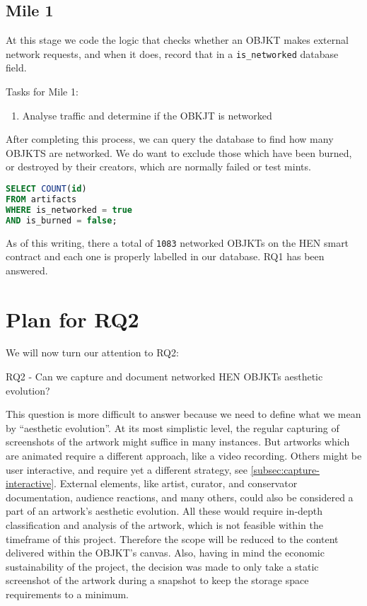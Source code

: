 \subsection {Mile 1}

At this stage we code the logic that checks whether an OBJKT makes external network requests, and when it does, record that in a \texttt{is\_networked} database field.

Tasks for Mile 1:
\begin{enumerate}
	\item Analyse traffic and determine if the OBKJT is networked
\end{enumerate}


After completing this process, we can query the database to find how many OBJKTS are networked. We do want to exclude those which have been burned, or destroyed by their creators, which are normally failed or test mints.

\begin{center}
\begin{lstlisting}[language=SQL, caption={SQL query - number of networked OBJKTs}]
SELECT COUNT(id)
FROM artifacts
WHERE is_networked = true
AND is_burned = false;
\end{lstlisting}
\end{center}

As of this writing, there a total of \texttt{1083} networked OBJKTs on the HEN smart contract and each one is properly labelled in our database. RQ1 has been answered.


\section{Plan for RQ2}

We will now turn our attention to RQ2:

\vspace{0.5cm}
RQ2 - Can we capture and document networked HEN OBJKTs aesthetic evolution?
\vspace{0.5cm}


This question is more difficult to answer because we need to define what we mean by ``aesthetic evolution''. At its most simplistic level, the regular capturing of screenshots of the artwork might suffice in many instances. But artworks which are animated require a different approach, like a video recording. Others might be user interactive, and require yet a different strategy, see \autoref{subsec:capture-interactive}. External elements, like artist, curator, and conservator documentation, audience reactions, and many others, could also be considered a part of an artwork's aesthetic evolution. All these would require in-depth classification and analysis of the artwork, which is not feasible within the timeframe of this project. Therefore the scope will be reduced to the content delivered within the OBJKT's canvas. Also, having in mind the economic sustainability of the project, the decision was made to only take a static screenshot of the artwork during a snapshot to keep the storage space requirements to a minimum.


